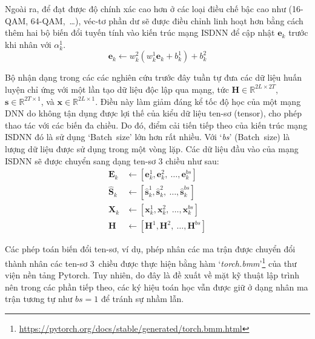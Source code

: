 Ngoài ra, để đạt được độ chính xác cao hơn ở các loại điều chế bậc cao như (16-QAM, 64-QAM,~\ldots), véc-tơ phần dư sẽ được điều chỉnh linh hoạt hơn bằng cách thêm hai bộ biến đổi tuyến tính vào kiến trúc mạng ISDNN để cập nhật $\mathbf{e}_k$ trước khi nhân với $\alpha^1_k$.
\begin{equation}
\mathbf{e}_k \leftarrow w^2_{k}\left(w^1_{k} \mathbf{e}_k+b^1_{k}\right)+b^2_{k}
\end{equation}

Bộ nhận dạng trong các các nghiên cứu trước đây tuần tự đưa các dữ liệu huấn luyện chỉ ứng với một lần tạo dữ liệu độc lập qua mạng, tức $\mathbf{H} \in \mathbb{R}^{2L \times 2T}$, $\mathbf{s} \in \mathbb{R}^{2T \times 1}$, và $\mathbf{x} \in \mathbb{R}^{2L \times 1}$. Điều này làm giảm đáng kể tốc độ học của một mạng DNN do không tận dụng được lợi thế của kiểu dữ liệu ten-sơ (tensor), cho phép thao tác với các biến đa chiều. Do đó, điểm cải tiến tiếp theo của kiến trúc mạng ISDNN đó là sử dụng `Batch~size' lớn hơn rất nhiều. Với `\textit{bs}' (Batch~size) là lượng dữ liệu được sử dụng trong một vòng lặp. Các dữ liệu đầu vào của mạng ISDNN sẽ được chuyển sang dạng ten-sơ $3$ chiều như sau:
\begin{subequations}
    \begin{align}
        \mathbf{E}_k &\leftarrow [\mathbf{e}_k^1, \mathbf{e}_k^2,~\ldots, \mathbf{e}_k^{bs}]\\
        \hat{\mathbf{S}}_k &\leftarrow [\hat{\mathbf{s}}_k^1, \hat{\mathbf{s}}_k^2,~\ldots, \hat{\mathbf{s}}_k^{bs}] \\
        \mathbf{X}_k &\leftarrow [\mathbf{x}_k^1, \mathbf{x}_k^2,~\ldots, \mathbf{x}_k^{bs}] \\
        \mathbf{H}   &\leftarrow [\mathbf{H}^1, \mathbf{H}^2,~\ldots, \mathbf{H}^{bs}]  
    \end{align}
\end{subequations}

Các phép toán biến đổi ten-sơ, ví dụ, phép nhân các ma trận được chuyển đổi thành nhân các ten-sơ $3$~chiều được thực hiện bằng hàm `\textit{torch.bmm}'\footnote{\url{https://pytorch.org/docs/stable/generated/torch.bmm.html}} của thư viện nền tảng Pytorch. Tuy nhiên, do đây là đề xuất về mặt kỹ thuật lập trình nên trong các phần tiếp theo, các ký hiệu toán học vẫn được giữ ở dạng nhân ma trận tương tự như $bs = 1$ để tránh sự nhầm lẫn.

